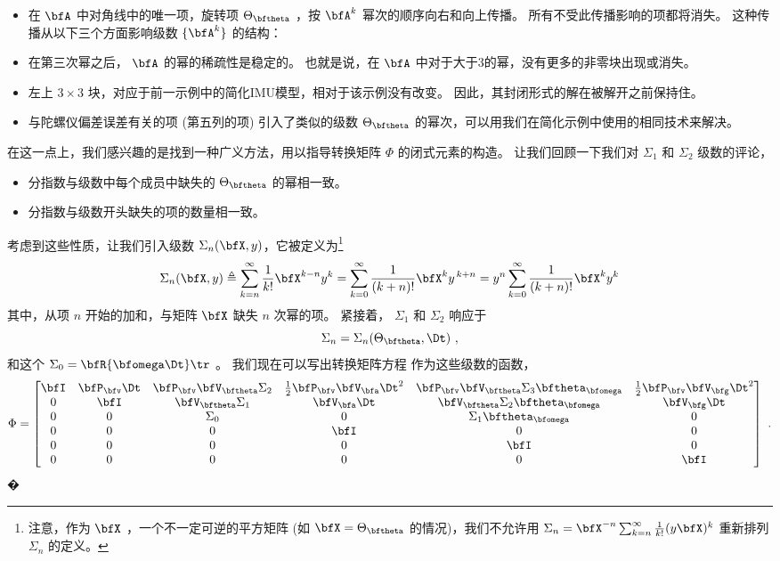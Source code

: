 \begin{itemize}
\item
在 $\bfA$ 中对角线中的唯一项，旋转项 $\Theta_\bftheta$ ，按 $\bfA^k$ 幂次的顺序向右和向上传播。
所有不受此传播影响的项都将消失。 
这种传播从以下三个方面影响级数 $\{\bfA^k\}$ 的结构：
\item 
在第三次幂之后， $\bfA$ 的幂的稀疏性是稳定的。 
也就是说，在 $\bfA$ 中对于大于3的幂，没有更多的非零块出现或消失。
\item 
左上 $3\times 3$ 块，对应于前一示例中的简化IMU模型，相对于该示例没有改变。 
因此，其封闭形式的解在被解开之前保持住。
\item 
与陀螺仪偏差误差有关的项 (第五列的项) 引入了类似的级数 $\Theta_\bftheta$ 的幂次，可以用我们在简化示例中使用的相同技术来解决。 
\end{itemize}

在这一点上，我们感兴趣的是找到一种广义方法，用以指导转换矩阵 $\Phi$ 的闭式元素的构造。
让我们回顾一下我们对 $\Sigma_1$ 和 $\Sigma_2$ 级数的评论，
%
\begin{itemize}
\item 分指数与级数中每个成员中缺失的 $\Theta_\bftheta$ 的幂相一致。
\item 分指数与级数开头缺失的项的数量相一致。
\end{itemize}

考虑到这些性质，让我们引入级数 $\Sigma_n(\bfX,y)$，它被定义为\footnote{注意，作为 $\bfX$ ，一个不一定可逆的平方矩阵 (如 $\bfX=\Theta_\bftheta$ 的情况)，我们不允许用 $\Sigma_n=\bfX^{-n}\sum_{k=n}^\infty\frac{1}{k!}(y\bfX)^{k}$ 重新排列 $\Sigma_n$ 的定义。}
%
\begin{equation}
\Sigma_n(\bfX,y) \triangleq \sum_{k=n}^\infty \frac{1}{k!}\bfX^{k-n}y^k = \sum_{k=0}^\infty \frac{1}{(k+n)!}\bfX^{k}y^{\,k+n}= y^n\sum_{k=0}^\infty \frac{1}{(k+n)!}\bfX^k y^k
\end{equation}
%
其中，从项 $n$ 开始的加和，与矩阵 $\bfX$ 缺失 $n$ 次幂的项。 
紧接着， $\Sigma_1$ 和 $\Sigma_2$ 响应于 
%
\begin{equation}
\Sigma_n=\Sigma_n(\Theta_\bftheta,\Dt)~,
\end{equation}
%
和这个 $\Sigma_0 = \bfR\{\bfomega\Dt\}\tr$ 。
我们现在可以写出转换矩阵方程  作为这些级数的函数，
%
\begin{equation}
\Phi = \begin{bmatrix}
\bfI & \bfP_\bfv\Dt & \bfP_\bfv\bfV_\bftheta\Sigma_2 &  \tfrac12\bfP_\bfv\bfV_\bfa\Dt^2 & \bfP_\bfv\bfV_\bftheta\Sigma_3\bftheta_\bfomega & \tfrac12\bfP_\bfv\bfV_\bfg\Dt^2 \\
0 & \bfI & \bfV_\bftheta\Sigma_1 &  \bfV_\bfa\Dt & \bfV_\bftheta\Sigma_2\bftheta_\bfomega & \bfV_\bfg\Dt \\
0 & 0 & \Sigma_0 &  0 & \Sigma_1\bftheta_\bfomega & 0 \\
0 & 0 & 0 & \bfI & 0 & 0 \\
0 & 0 & 0 & 0 & \bfI & 0 \\
0 & 0 & 0 & 0 & 0 & \bfI \\
\end{bmatrix}~.\label{equ:fullIMUtranmat}
\end{equation}�

